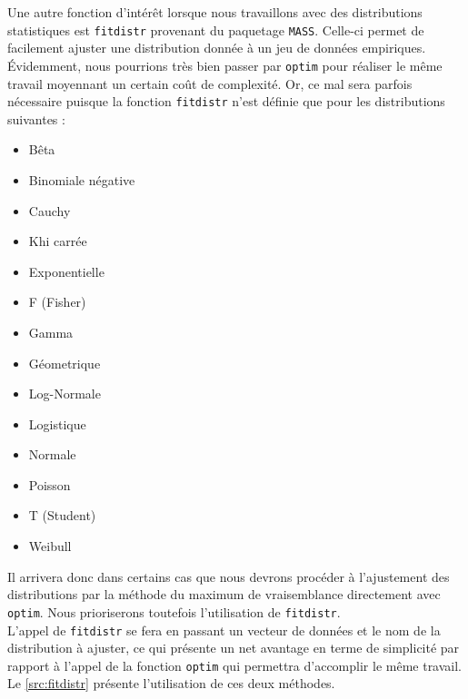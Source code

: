 Une autre fonction d'intérêt lorsque nous travaillons avec des distributions statistiques est \texttt{fitdistr} provenant du paquetage \texttt{MASS}. Celle-ci permet de facilement ajuster une distribution donnée à un jeu de données empiriques. Évidemment, nous pourrions très bien passer par \texttt{optim} pour réaliser le même travail moyennant un certain coût de complexité. Or, ce mal sera parfois nécessaire puisque la fonction \texttt{fitdistr} n'est définie que pour les distributions suivantes : \cite{pkgR:MASS}

\begin{minipage}{\linewidth}
	\begin{multicols}{2}
		\begin{itemize}
			\item Bêta
			\item Binomiale négative
			\item Cauchy
			\item Khi carrée
			\item Exponentielle
			\item F (Fisher)
			\item Gamma
			\columnbreak
			\item Géometrique
			\item Log-Normale
			\item Logistique
			\item Normale
			\item Poisson
			\item T (Student)
			\item Weibull
		\end{itemize}
	\end{multicols}
\end{minipage}
\vspace{\baselineskip}

Il arrivera donc dans certains cas que nous devrons procéder à l'ajustement des distributions par la méthode du maximum de vraisemblance directement avec \texttt{optim}. Nous prioriserons toutefois l'utilisation de \texttt{fitdistr}. \\

L'appel de \texttt{fitdistr} se fera en passant un vecteur de données et le nom de la distribution à ajuster, ce qui présente un net avantage en terme de simplicité par rapport à l'appel de la fonction \texttt{optim} qui permettra d'accomplir le même travail. Le \autoref{src:fitdistr} présente l'utilisation de ces deux méthodes. \\

